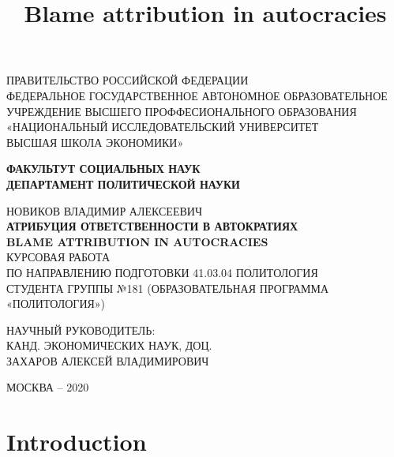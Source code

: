 \documentclass[a4paper, 12pt]{article}
\title{Blame attribution in autocracies}
\begin{document}
    \thispagestyle{empty}
\begin{center}
 \small{ПРАВИТЕЛЬСТВО РОССИЙСКОЙ ФЕДЕРАЦИИ \\
\vspace{4ex}
  ФЕДЕРАЛЬНОЕ ГОСУДАРСТВЕННОЕ АВТОНОМНОЕ ОБРАЗОВАТЕЛЬНОЕ \\
  \vspace{2ex}
  УЧРЕЖДЕНИЕ ВЫСШЕГО ПРОФФЕСИОНАЛЬНОГО ОБРАЗОВАНИЯ \\ 
  \vspace{4ex}
  «НАЦИОНАЛЬНЫЙ ИССЛЕДОВАТЕЛЬСКИЙ УНИВЕРСИТЕТ \\
  \vspace{2ex}
  ВЫСШАЯ ШКОЛА ЭКОНОМИКИ»}
 \vspace{8ex}
 
 \normalsize{\textbf{ФАКУЛЬТУТ СОЦИАЛЬНЫХ НАУК \\}}
 \normalsize{\textbf{ДЕПАРТАМЕНТ ПОЛИТИЧЕСКОЙ НАУКИ \\}}
\end{center}
\vspace{10ex}
\begin{center}
 НОВИКОВ ВЛАДИМИР АЛЕКСЕЕВИЧ \\
 \vspace{4ex}
 \textbf{АТРИБУЦИЯ ОТВЕТСТВЕННОСТИ В АВТОКРАТИЯХ}\\
 \vspace{4ex}
 \textbf{BLAME ATTRIBUTION IN AUTOCRACIES} \\
 \vspace{4ex}
 КУРСОВАЯ РАБОТА \\
 ПО НАПРАВЛЕНИЮ ПОДГОТОВКИ 41.03.04 ПОЛИТОЛОГИЯ \\
 СТУДЕНТА ГРУППЫ №181 (ОБРАЗОВАТЕЛЬНАЯ ПРОГРАММА «ПОЛИТОЛОГИЯ»)
\end{center}
\vspace{10ex}
\begin{flushright}
 \noindent
 НАУЧНЫЙ РУКОВОДИТЕЛЬ:
 \\
 КАНД. ЭКОНОМИЧЕСКИХ НАУК, ДОЦ.
 \\
 ЗАХАРОВ АЛЕКСЕЙ ВЛАДИМИРОВИЧ
\vspace{2ex}
\end{flushright}

\begin{center}
 \vfill
 МОСКВА -- 2020
\end{center}
	\newpage
	\setcounter{page}{1}
    
    \tableofcontents
    
    
    \section{Introduction}
    
\end{document}
